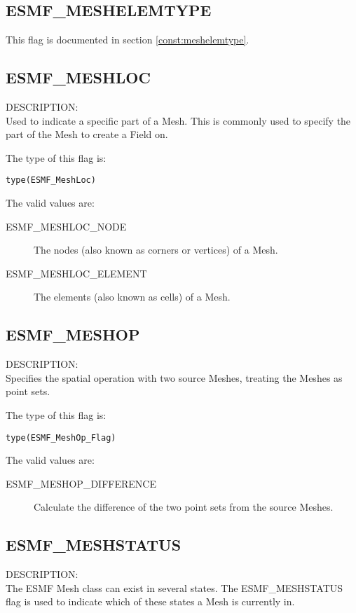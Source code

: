 \subsection{ESMF\_MESHELEMTYPE}
This flag is documented in section \ref{const:meshelemtype}.

\subsection{ESMF\_MESHLOC}
\label{const:meshloc}
{\sf DESCRIPTION:\\}  
Used to indicate a specific part of a Mesh. This is commonly used to specify the part of the Mesh to
create a Field on. 

The type of this flag is:

{\tt type(ESMF\_MeshLoc)}

The valid values are:
\begin{description}

\item [ESMF\_MESHLOC\_NODE]
         The nodes (also known as corners or vertices) of a Mesh. 

\item [ESMF\_MESHLOC\_ELEMENT]
         The elements (also known as cells) of a Mesh. 
\end{description}


\subsection{ESMF\_MESHOP}
\label{const:meshop}
{\sf DESCRIPTION:\\}  
 Specifies the spatial operation with two source Meshes, treating the Meshes as point sets.

The type of this flag is:

{\tt type(ESMF\_MeshOp\_Flag)}

The valid values are:
\begin{description}

\item [ESMF\_MESHOP\_DIFFERENCE]
         Calculate the difference of the two point sets from the source Meshes.
\end{description}

\subsection{ESMF\_MESHSTATUS}
\label{const:meshstatus}

{\sf DESCRIPTION:\\}
The ESMF Mesh class can exist in several states. The ESMF\_MESHSTATUS 
flag is used to indicate which of these states a Mesh is currently in. 

